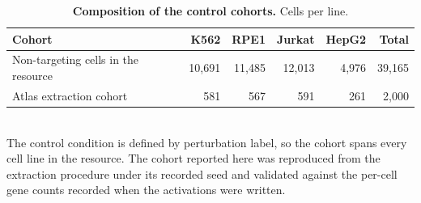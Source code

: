 \begin{table}[htbp]
\centering
\caption{\textbf{Composition of the control cohorts.} Cells per line.}
\label{tab:cohorts}
\smallskip
\small
\begin{tabular}{lrrrrr}
\toprule
Cohort & K562 & RPE1 & Jurkat & HepG2 & Total \\
\midrule
Non-targeting cells in the resource & 10,691 & 11,485 & 12,013 & 4,976 & 39,165 \\
Atlas extraction cohort & 581 & 567 & 591 & 261 & 2,000 \\
\bottomrule
\end{tabular}
\\[2pt]
\footnotesize The control condition is defined by perturbation label, so the cohort spans every cell line in the resource. The cohort reported here was reproduced from the extraction procedure under its recorded seed and validated against the per-cell gene counts recorded when the activations were written.
\end{table}
